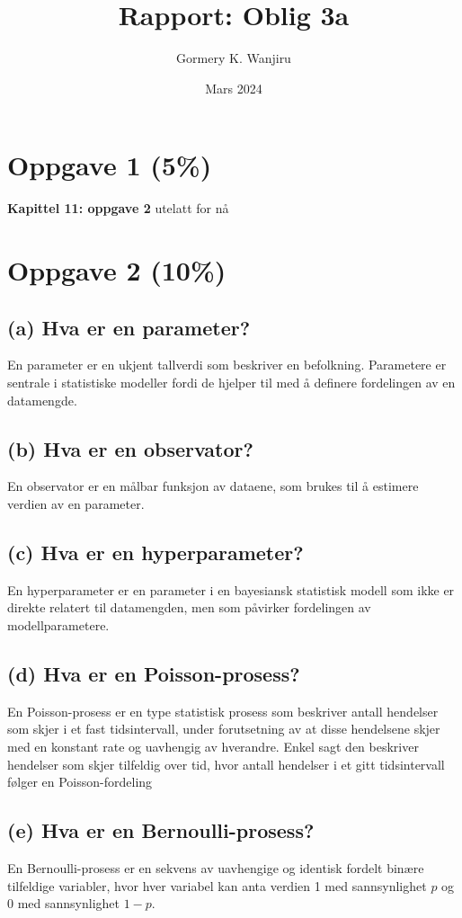 \documentclass{article}
\title{Rapport: Oblig 3a}
\author{Gormery K. Wanjiru}
\date{Mars 2024}
\begin{document}
\maketitle

\section{Oppgave 1 (5\%)}
\textbf{Kapittel 11: oppgave 2}
utelatt for nå

\section{Oppgave 2 (10\%)}
\subsection*{(a) Hva er en parameter?}
En parameter er en ukjent tallverdi som beskriver en befolkning. Parametere er sentrale i statistiske modeller fordi de hjelper til med å definere fordelingen av en datamengde.

\subsection*{(b) Hva er en observator?}
En observator er en målbar funksjon av dataene, som brukes til å estimere verdien av en parameter.

\subsection*{(c) Hva er en hyperparameter?}
En hyperparameter er en parameter i en bayesiansk statistisk modell som ikke er direkte relatert til datamengden, men som påvirker fordelingen av modellparametere.

\subsection*{(d) Hva er en Poisson-prosess?}
En Poisson-prosess er en type statistisk prosess som beskriver antall hendelser som skjer i et fast tidsintervall, under forutsetning av at disse hendelsene skjer med en konstant rate og uavhengig av hverandre. Enkel sagt den beskriver hendelser som skjer tilfeldig over tid, hvor antall hendelser i et gitt tidsintervall følger en Poisson-fordeling

\subsection*{(e) Hva er en Bernoulli-prosess?}
En Bernoulli-prosess er en sekvens av uavhengige og identisk fordelt binære tilfeldige variabler, hvor hver variabel kan anta verdien 1 med sannsynlighet \(p\) og 0 med sannsynlighet \(1-p\).
\end{document}
